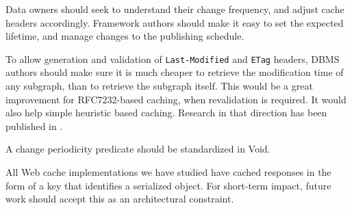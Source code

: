 \documentclass{llncs}
\newcommand{\httph}[1]{\texttt{#1}}
\begin{document}
Data owners should seek to understand their change frequency, and
adjust cache headers accordingly. Framework authors should make it
easy to set the expected lifetime, and manage changes to the
publishing schedule.

To allow generation and validation of \httph{Last-Modified} and
\httph{ETag} headers, DBMS authors should make sure it is much cheaper
to retrieve the modification time of any subgraph, than to retrieve
the subgraph itself. This would be a great improvement for
RFC7232-based caching, when revalidation is required. It would also
help simple heuristic based caching. Research in that direction has
been published in \cite{kaseicache}.

A change periodicity predicate should be standardized in Void.

All Web cache implementations we have studied have cached responses in
the form of a key that identifies a serialized object. For short-term
impact, future work should accept this as an architectural constraint.


%
%
%

\end{document}
